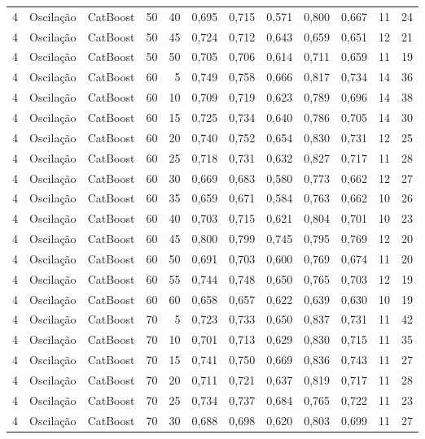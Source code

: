 \begin{longtable}{@{}rllrrrrrrrrr@{}}
4 & Oscilação & CatBoost & 50 & 40 & 0,695 & 0,715 & 0,571 & 0,800 & 0,667 & 11 & 24 \\
4 & Oscilação & CatBoost & 50 & 45 & 0,724 & 0,712 & 0,643 & 0,659 & 0,651 & 12 & 21 \\
4 & Oscilação & CatBoost & 50 & 50 & 0,705 & 0,706 & 0,614 & 0,711 & 0,659 & 11 & 19 \\
4 & Oscilação & CatBoost & 60 & 5 & 0,749 & 0,758 & 0,666 & 0,817 & 0,734 & 14 & 36 \\
4 & Oscilação & CatBoost & 60 & 10 & 0,709 & 0,719 & 0,623 & 0,789 & 0,696 & 14 & 38 \\
4 & Oscilação & CatBoost & 60 & 15 & 0,725 & 0,734 & 0,640 & 0,786 & 0,705 & 14 & 30 \\
4 & Oscilação & CatBoost & 60 & 20 & 0,740 & 0,752 & 0,654 & 0,830 & 0,731 & 12 & 25 \\
4 & Oscilação & CatBoost & 60 & 25 & 0,718 & 0,731 & 0,632 & 0,827 & 0,717 & 11 & 28 \\
4 & Oscilação & CatBoost & 60 & 30 & 0,669 & 0,683 & 0,580 & 0,773 & 0,662 & 12 & 27 \\
4 & Oscilação & CatBoost & 60 & 35 & 0,659 & 0,671 & 0,584 & 0,763 & 0,662 & 10 & 26 \\
4 & Oscilação & CatBoost & 60 & 40 & 0,703 & 0,715 & 0,621 & 0,804 & 0,701 & 10 & 23 \\
4 & Oscilação & CatBoost & 60 & 45 & 0,800 & 0,799 & 0,745 & 0,795 & 0,769 & 12 & 20 \\
4 & Oscilação & CatBoost & 60 & 50 & 0,691 & 0,703 & 0,600 & 0,769 & 0,674 & 11 & 20 \\
4 & Oscilação & CatBoost & 60 & 55 & 0,744 & 0,748 & 0,650 & 0,765 & 0,703 & 12 & 19 \\
4 & Oscilação & CatBoost & 60 & 60 & 0,658 & 0,657 & 0,622 & 0,639 & 0,630 & 10 & 19 \\
4 & Oscilação & CatBoost & 70 & 5 & 0,723 & 0,733 & 0,650 & 0,837 & 0,731 & 11 & 42 \\
4 & Oscilação & CatBoost & 70 & 10 & 0,701 & 0,713 & 0,629 & 0,830 & 0,715 & 11 & 35 \\
4 & Oscilação & CatBoost & 70 & 15 & 0,741 & 0,750 & 0,669 & 0,836 & 0,743 & 11 & 27 \\
4 & Oscilação & CatBoost & 70 & 20 & 0,711 & 0,721 & 0,637 & 0,819 & 0,717 & 11 & 28 \\
4 & Oscilação & CatBoost & 70 & 25 & 0,734 & 0,737 & 0,684 & 0,765 & 0,722 & 11 & 23 \\
4 & Oscilação & CatBoost & 70 & 30 & 0,688 & 0,698 & 0,620 & 0,803 & 0,699 & 11 & 27 \\

\end{longtable}
